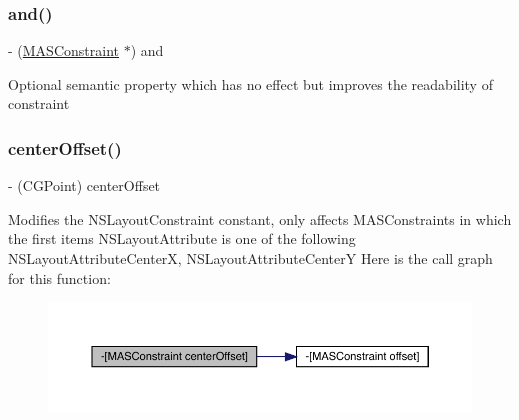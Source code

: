 \subsubsection{\texorpdfstring{and()}{and()}}
{\footnotesize\ttfamily -\/ (\mbox{\hyperlink{interface_m_a_s_constraint}{M\+A\+S\+Constraint}} $\ast$) and \begin{DoxyParamCaption}{ }\end{DoxyParamCaption}}

Optional semantic property which has no effect but improves the readability of constraint \mbox{\label{interface_m_a_s_constraint_a8f353c8e713090e59282ef98dfc5c138}} 
\subsubsection{\texorpdfstring{center\+Offset()}{centerOffset()}}
{\footnotesize\ttfamily -\/ (C\+G\+Point) center\+Offset \begin{DoxyParamCaption}{ }\end{DoxyParamCaption}}

Modifies the N\+S\+Layout\+Constraint constant, only affects M\+A\+S\+Constraints in which the first item\textquotesingle{}s N\+S\+Layout\+Attribute is one of the following N\+S\+Layout\+Attribute\+CenterX, N\+S\+Layout\+Attribute\+CenterY Here is the call graph for this function\+:\nopagebreak
\begin{figure}[H]
\begin{center}
\leavevmode
\includegraphics[width=350pt]{interface_m_a_s_constraint_a8f353c8e713090e59282ef98dfc5c138_cgraph}
\end{center}
\end{figure}
\mbox{\label{interface_m_a_s_constraint_a9bff9af2ccc3e7d115f9cf72650f1d9c}} 
